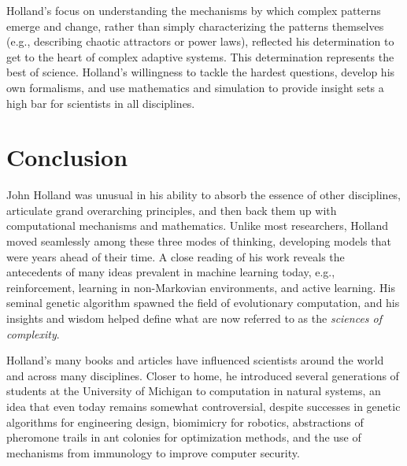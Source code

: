 \documentclass{sig-alternate}
\begin{document}
Holland's focus on understanding the mechanisms by which complex patterns emerge and change,
rather than simply characterizing the patterns themselves (e.g.,
describing chaotic attractors or power laws), reflected his
determination to get to the heart of complex adaptive systems.
This determination represents the best of science.  Holland's
willingness to tackle the hardest questions, develop his own
formalisms, and use mathematics and simulation to provide insight sets a high bar for
scientists in all disciplines.



\section{Conclusion}

John Holland was unusual in his ability to absorb the essence of other
disciplines, articulate grand overarching
principles, and then back them up with computational mechanisms and
mathematics.  Unlike most researchers, Holland moved seamlessly among these
three modes of thinking, developing models that were years ahead of their time.  A
close reading of his work reveals the antecedents of many ideas prevalent in
machine learning today, e.g., reinforcement, learning in non-Markovian
environments, and active learning.   His seminal genetic algorithm
spawned the field of evolutionary computation, and his insights
and wisdom helped define what are now referred to as the
\emph{sciences of complexity}.   

Holland's many books and articles have influenced scientists around
the world and across many disciplines.  Closer to home, he introduced
several generations of students at the University of Michigan to
computation in natural systems, an idea that even today remains
somewhat controversial, despite successes in genetic algorithms for
engineering design, biomimicry for robotics, abstractions of pheromone
trails in ant colonies for optimization methods, and the use of
mechanisms from immunology to improve computer security.
\end{document}

